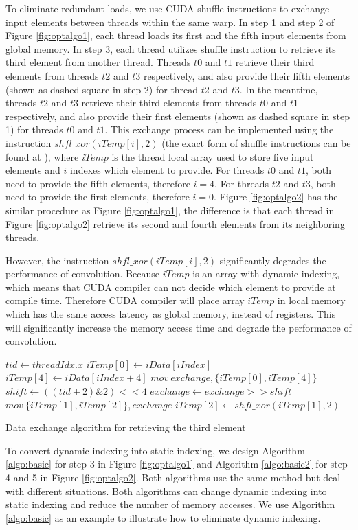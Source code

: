 \documentclass[sigplan,review,anonymous]{acmart}\settopmatter{printfolios=true,printccs=false,printacmref=false}
\begin{document}
To eliminate redundant loads, we use CUDA shuffle instructions to exchange input elements between threads within the same warp. In step 1 and step 2 of Figure \ref{fig:optalgo1}, each thread loads its first and the fifth input elements from global memory. In step 3, each thread utilizes shuffle instruction to retrieve its third element from another thread. Threads $t0$ and $t1$ retrieve their third elements from threads $t2$ and $t3$ respectively, and also provide their fifth elements (shown as dashed square in step 2) for thread $t2$ and $t3$. In the meantime, threads $t2$ and $t3$ retrieve their third elements from threads $t0$ and $t1$ respectively, and also provide their first elements (shown as dashed square in step 1) for threads $t0$ and $t1$. This exchange process can be implemented using the instruction $shfl\_xor(iTemp[i],2)$ (the exact form of shuffle instructions can be found at \cite{CUDAtoolkit}), where $iTemp$ is the thread local array used to store five input elements and $i$ indexes which element to provide. For threads $t0$ and $t1$, both need to provide the fifth elements, therefore $i=4$. For threads $t2$ and $t3$, both need to provide the first elements, therefore $i=0$. Figure \ref{fig:optalgo2} has the similar procedure as Figure \ref{fig:optalgo1}, the difference is that each thread in Figure \ref{fig:optalgo2} retrieve its second and fourth elements from its neighboring threads.


However, the instruction $shfl\_xor(iTemp[i],2)$ significantly degrades the performance of convolution. Because $iTemp$ is an array with dynamic indexing, which means that CUDA compiler can not decide which element to provide at compile time. Therefore CUDA compiler will place array $iTemp$ in local memory which has the same access latency as global memory, instead of registers. This will significantly increase the memory access time and degrade the performance of convolution.

\begin{algorithm}
	$tid \gets threadIdx.x$\;
	$iTemp[0] \gets iData[iIndex]$\;
	$iTemp[4] \gets iData[iIndex+4]$\;
	$mov\ exchange, \{iTemp[0], iTemp[4]\}$\;
	$shift \gets ((tid+2)\&2)<<4$\;
	$exchange \gets exchange >> shift$\;
	$mov\ \{iTemp[1],iTemp[2]\}, exchange$\;
	$iTemp[2] \gets shfl\_xor(iTemp[1],2)$\;	
	
	\caption{Data exchange algorithm for retrieving the third element}
	\label{algo:basic}
\end{algorithm}

To convert dynamic indexing into static indexing, we design Algorithm \ref{algo:basic} for step 3 in Figure \ref{fig:optalgo1} and Algorithm \ref{algo:basic2} for step 4 and 5 in Figure \ref{fig:optalgo2}. Both algorithms use the same method but deal with different situations. Both algorithms can change dynamic indexing into static indexing and reduce the number of memory accesses. We use Algorithm \ref{algo:basic} as an example to illustrate how to eliminate dynamic indexing.
\end{document}
